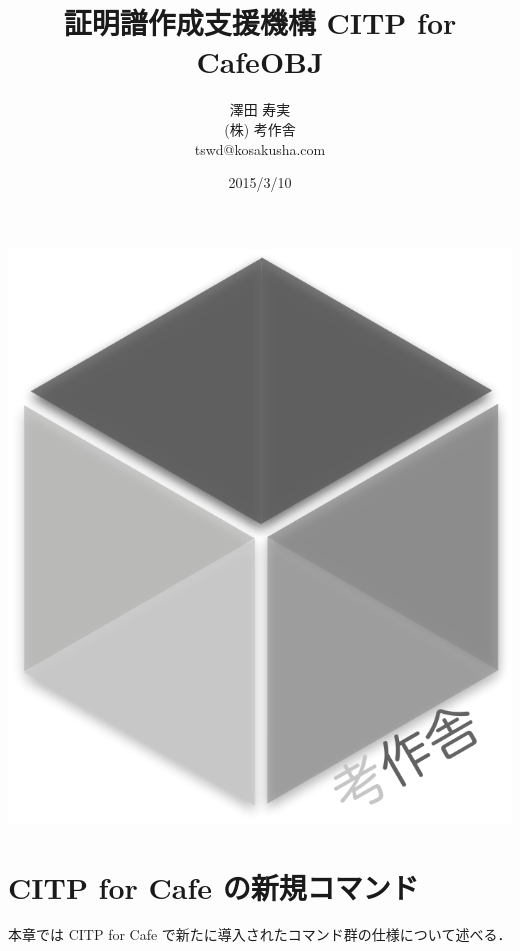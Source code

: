 \documentclass[a4paper,oneside,10pt,here]{memoir}
\begin{document}
\tightlists
\sloppy
\raggedbottom
{}
\frontmatter
\pagestyle{empty}
\title{証明譜作成支援機構 CITP for CafeOBJ}
\vfill
\author{澤田 寿実\\
  (株) 考作舎\\
  tswd@kosakusha.com}
\date{2015/3/10}
\maketitle
\vfill
\begin{center}
\includegraphics[scale=0.2]{kosakusha2_gray.pdf}
\end{center}
\vfill
\thispagestyle{empty}
\newpage
\mainmatter
\pagestyle{plain}
\tableofcontents
\EnableBpAbbreviations
\newpage
\chapter{CITP for Cafe の新規コマンド}\label{chap:new-commands}
本章では CITP for Cafe で新たに導入されたコマンド群の仕様について述べる．
\end{document}
